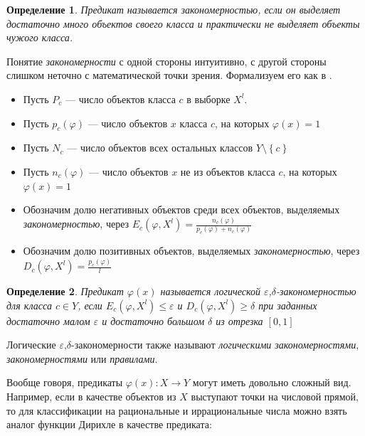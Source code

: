 \documentclass[12pt]{article}
\newtheorem{definition}{Определение}
\begin{document}
\begin{definition}
  Предикат называется \emph{закономерностью}, если он выделяет
  достаточно много объектов своего класса и практически не выделяет
  объекты чужого класса.
\end{definition}

Понятие \emph{закономерности} с одной стороны интуитивно, с другой
стороны слишком неточно с математической точки зрения. Формализуем его
как в \cite{voron10logicalgs}.

\begin{itemize}
\item Пусть \(P_c\) --- число объектов класса \(c\) в выборке \(X^l\).
\item Пусть \(p_c(\varphi)\) --- число объектов \(x\) класса \(c\), на
  которых \(\varphi(x) = 1\)
\item Пусть \(N_c\) --- число объектов всех остальных классов \(Y
  \setminus \left\{c\right\}\)
\item Пусть \(n_c(\varphi)\) --- число объектов \(x\) не из объектов
  класса \(c\), на которых \(\varphi(x) = 1\)
\item Обозначим долю негативных объектов среди всех объектов,
  выделяемых \emph{закономерностью}, через \(E_c(\varphi, X^l) =
  \frac{n_c(\varphi)}{p_c(\varphi) + n_c(\varphi)}\)
\item Обозначим долю позитивных объектов, выделяемых
  \emph{закономерностью}, через \(D_c(\varphi, X^l) =
  \frac{p_c(\varphi)}{l}\)
\end{itemize}

\begin{definition}
  Предикат \(\varphi(x)\) называется \emph{логической
    \(\varepsilon\),\(\delta\)-закономерностью} для класса \(c \in
  Y\), если \(E_c(\varphi, X^l) \leq \varepsilon \) и \(D_c(\varphi,
  X^l)\geq\delta\) при заданных достаточно малом \(\varepsilon\) и
  достаточно большом \(\delta\) из отрезка \([0, 1]\)
\end{definition}

Логические \(\varepsilon\),\(\delta\)-закономерности также называют
\emph{логическими закономерностями}, \emph{закономерностями} или
\emph{правилами}.

Вообще говоря, предикаты \(\varphi(x)\colon X \rightarrow Y\) могут
иметь довольно сложный вид. Например, если в качестве объектов из
\(X\) выступают точки на числовой прямой, то для классификации на
рациональные и иррациональные числа можно взять аналог функции Дирихле
в качестве предиката:
\end{document}
